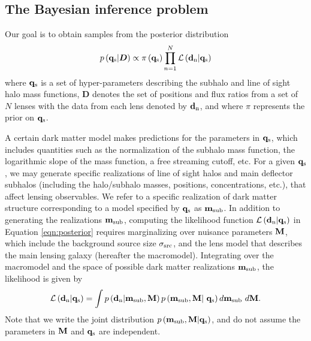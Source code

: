 \subsection{The Bayesian inference problem}
Our goal is to obtain samples from the posterior distribution 
\begin{equation}
\label{eqn:posterior}
p \left({\bf{q}_{\rm{s}}} | \boldsymbol{D} \right) \propto \pi \left({\bf{q}_{\rm{s}}}\right) \prod_{n=1}^{N} \mathcal{L} \left({\bf{d}_{\rm{n}}} | {\bf{q}_{\rm{s}}} \right) 
\end{equation}
where ${\bf{q}_{\rm{s}}}$ is a set of hyper-parameters describing the subhalo and line of sight halo mass functions, $\boldsymbol{D}$ denotes the set of positions and flux ratios from a set of $N$ lenses with the data from each lens denoted by ${\bf{d}_{\rm{n}}}$, and where $\pi$ represents the prior on ${\bf{q}_{\rm{s}}}$. 

A certain dark matter model makes predictions for the parameters in ${\bf{q}_{\rm{s}}}$, which includes quantities such as the normalization of the subhalo mass function, the logarithmic slope of the mass function, a free streaming cutoff, etc. For a given ${\bf{q}_{\rm{s}}}$, we may generate specific realizations of line of sight halos and main deflector subhalos (including the halo/subhalo masses, positions, concentrations, etc.), that affect lensing observables. We refer to a specific realization of dark matter structure corresponding to a model specified by ${\bf{q}_{\rm{s}}}$ as ${\bf{m}_{\rm{sub}}}$. In addition to generating the realizations ${\bf{m}_{\rm{sub}}}$, computing the likelihood function $\mathcal{L} \left({\bf{d}_{\rm{n}}} | {\bf{q}_{\rm{s}}} \right)$ in Equation \ref{eqn:posterior} requires marginalizing over nuisance parameters ${}{\bf{M}}$, which include the background source size $\sigma_{\rm{src}}$, and the lens model that describes the main lensing galaxy (hereafter the macromodel). Integrating over the macromodel and the space of possible dark matter realizations ${\bf{m}_{\rm{sub}}}$, the likelihood is given by
\begin{eqnarray}
\label{eqn:likelihood}
\mathcal{L} \left({\bf{d}_{\rm{n}}}| {\bf{q}_{\rm{s}}} \right) = \int p \left({\bf{d}_{\rm{n}}} | {\bf{m}_{\rm{sub}}}, {}{\bf{M}} \right) p \left( {\bf{m}_{\rm{sub}}}, {}{\bf{M}} | \ {\bf{q}_{\rm{s}}} \right) d {\bf{m}_{\rm{sub}}} \ d {}{\bf{M}}.
\end{eqnarray}
Note that we write the joint distribution $p\left({\bf{m}_{\rm{sub}}}, {\bf{M}} | {\bf{q}_{\rm{s}}}\right)$, and do not assume the parameters in ${}{\bf{M}}$ and ${\bf{q}_{\rm{s}}}$ are independent. 


